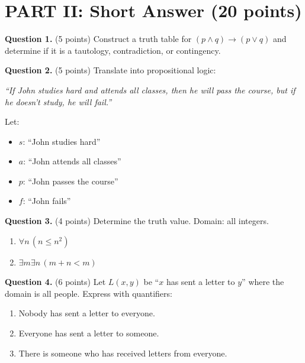 \documentclass[11pt,a4paper]{article}
\begin{document}
\newpage

\section*{PART II: Short Answer (20 points)}

\textbf{Question 1.} (5 points) Construct a truth table for $(p \land q) \to (p \lor q)$ and determine if it is a tautology, contradiction, or contingency.

\vspace{100pt}

\textbf{Question 2.} (5 points) Translate into propositional logic:

\textit{``If John studies hard and attends all classes, then he will pass the course, but if he doesn't study, he will fail.''}

Let:
\begin{itemize}[noitemsep]
    \item $s$: ``John studies hard''
    \item $a$: ``John attends all classes''
    \item $p$: ``John passes the course''
    \item $f$: ``John fails''
\end{itemize}

\vspace{80pt}

\textbf{Question 3.} (4 points) Determine the truth value. Domain: all integers.

\begin{enumerate}[label=(\roman*)]
    \item $\forall n\, (n \leq n^2)$
    
    \vspace{40pt}
    
    \item $\exists m \exists n\, (m + n < m)$
    
    \vspace{40pt}
\end{enumerate}

\textbf{Question 4.} (6 points) Let $L(x, y)$ be ``$x$ has sent a letter to $y$'' where the domain is all people. Express with quantifiers:

\begin{enumerate}[label=(\roman*)]
    \item Nobody has sent a letter to everyone.
    
    \vspace{40pt}
    
    \item Everyone has sent a letter to someone.
    
    \vspace{40pt}
    
    \item There is someone who has received letters from everyone.
    
    \vspace{40pt}
\end{enumerate}
\end{document}
